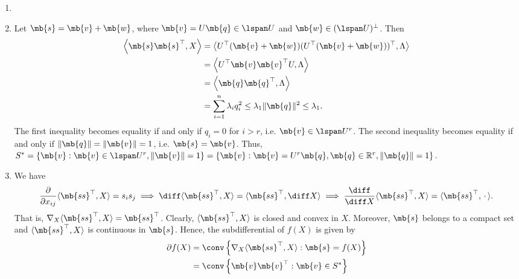 \begin{exercise}
\begin{enumerate}
      \begin{solution}
        \begin{enumerate}
          \item []
          \item Let $\mb{s} = \mb{v} + \mb{w}$, where $\mb{v} = U \mb{q} \in \lspan U$ and $\mb{w} \in (\lspan U)^\perp$. Then
            \begin{align*}
              \left\langle \mb{s}\mb{s}^{\top},X\right\rangle & = \left\langle U^\top (\mb{v} + \mb{w})(U^\top (\mb{v} + \mb{w}))^\top,\Lambda \right\rangle \\ 
                                                              & = \left\langle U^\top \mb{v} \mb{v}^\top U, \Lambda \right\rangle                            \\
                                                              & = \left\langle \mb{q} \mb{q}^\top, \Lambda \right\rangle                                     \\ 
                                                              & = \sum_{i = 1}^n \lambda_i q_i^2 \le \lambda_1 \|\mb{q}\|^2 \le \lambda_1.
            \end{align*}
            The first inequality becomes equality if and only if $q_i = 0$ for $i > r$, i.e. $\mb{v} \in \lspan U^r$. The second inequality becomes equality if and only if $\|\mb{q}\| = \|\mb{v}\| = 1$, i.e. $\mb{s} = \mb{v}$. Thus, $S^* = \left\{\mb{v}: \mb{v} \in \lspan U^{r}, \|\mb{v}\| = 1\right\} = \left\{\mb{v}: \mb{v}=U^{r} \mb{q}, \mb{q} \in \mathbb{R}^{r}, \|\mb{q}\|=1\right\}$.
          \item We have
            $$
              \frac{\partial}{\partial x_{ij}} \langle \mb{ss}^\top, X\rangle = s_i s_j \implies \diff \langle \mb{ss}^\top, X\rangle = \langle \mb{ss}^\top, \diff X\rangle \implies \frac{\diff}{\diff X} \langle \mb{ss}^\top, X\rangle = \langle \mb{ss}^\top, \,\cdot\,\rangle.
            $$
            That is, $\nabla_X \langle \mb{ss}^\top, X\rangle = \mb{ss}^\top$. Clearly, $\langle \mb{ss}^\top, X\rangle$ is closed and convex in $X$. Moreover, $\mb{s}$ belongs to a compact set and $\langle \mb{ss}^\top, X\rangle$ is continuous in $\mb{s}$. Hence, the subdifferential of $f(X)$ is given by
            \begin{align*}
              \partial f(X) & = \conv\left\{\nabla_X \langle \mb{ss}^\top, X\rangle: \mb{s}= f(X)\right\}                       \\
                            & = \conv\left\{\mb{v} \mb{v}^\top: \mb{v} \in S^*\right\}                                          \\

\end{align*}
\end{enumerate}
\end{solution}
\end{enumerate}
\end{exercise}
